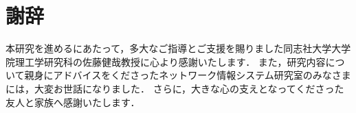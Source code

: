 \documentclass[a4paper,11pt,uplatex]{ujreport}
\begin{document}
\chapter*{謝辞}
\label{sec:Acknowledgments}

  \noindent
  本研究を進めるにあたって，多大なご指導とご支援を賜りました同志社大学大学院理工学研究科の佐藤健哉教授に心より感謝いたします．
  また，研究内容について親身にアドバイスをくださったネットワーク情報システム研究室のみなさまには，大変お世話になりました．
  さらに，大きな心の支えとなってくださった友人と家族へ感謝いたします．





\renewcommand{\bibname}{参考文献}
\end{document}
